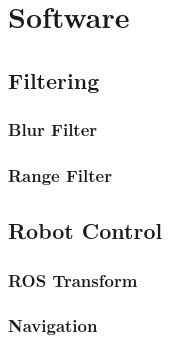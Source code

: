 \chapter{Software}
\graphicspath{{./Software/img/}}
 
\section{Filtering}
\subsection{Blur Filter}
\subsection{Range Filter}
\section{Robot Control}
\subsection{ROS Transform}
\subsection{Navigation}
